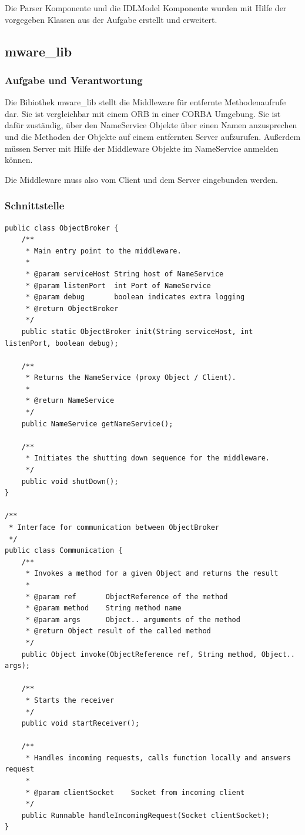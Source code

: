 \documentclass{article}
\begin{document}
Die Parser Komponente und die IDLModel Komponente wurden mit Hilfe der vorgegeben Klassen aus der Aufgabe erstellt und
erweitert.

\subsection{mware\_lib}
\subsubsection{Aufgabe und Verantwortung}
Die Bibiothek mware\_lib stellt die Middleware für entfernte Methodenaufrufe dar. Sie ist vergleichbar mit einem ORB in
einer CORBA Umgebung. Sie ist dafür zuständig, über den NameService Objekte über einen Namen anzusprechen und die
Methoden der Objekte auf einem entfernten Server aufzurufen. Außerdem müssen Server mit Hilfe der Middleware Objekte im
NameService anmelden können.

Die Middleware muss also vom Client und dem Server eingebunden werden.

\subsubsection{Schnittstelle}
\begin{lstlisting}
public class ObjectBroker {
    /**
     * Main entry point to the middleware.
     *
     * @param serviceHost String host of NameService
     * @param listenPort  int Port of NameService
     * @param debug       boolean indicates extra logging
     * @return ObjectBroker
     */
    public static ObjectBroker init(String serviceHost, int listenPort, boolean debug);

    /**
     * Returns the NameService (proxy Object / Client).
     *
     * @return NameService
     */
    public NameService getNameService();

    /**
     * Initiates the shutting down sequence for the middleware.
     */
    public void shutDown();
}

/**
 * Interface for communication between ObjectBroker
 */
public class Communication {
    /**
     * Invokes a method for a given Object and returns the result
     *
     * @param ref       ObjectReference of the method
     * @param method    String method name
     * @param args      Object.. arguments of the method
     * @return Object result of the called method
     */
    public Object invoke(ObjectReference ref, String method, Object.. args);

    /**
     * Starts the receiver
     */
    public void startReceiver();

    /**
     * Handles incoming requests, calls function locally and answers request
     *
     * @param clientSocket    Socket from incoming client
     */
    public Runnable handleIncomingRequest(Socket clientSocket);
}
\end{lstlisting}
\end{document}
